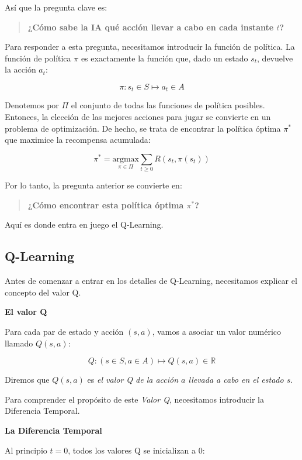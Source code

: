 \documentclass[]{book}
\begin{document}
Así que la pregunta clave es:

\begin{quote}
\textbf{¿Cómo sabe la IA qué acción llevar a cabo en cada instante \(t\)?}
\end{quote}

Para responder a esta pregunta, necesitamos introducir la función de política. La función de política \(\pi\) es exactamente la función que, dado un estado \(s_t\), devuelve la acción \(a_t\):

\[\pi: s_t \in S \mapsto a_t \in A\]

Denotemos por \(\Pi\) el conjunto de todas las funciones de política posibles. Entonces, la elección de las mejores acciones para jugar se convierte en un problema de optimización. De hecho, se trata de encontrar la política óptima \(\pi^*\) que maximice la recompensa acumulada:

\[\pi^* = \underset{\pi \in \Pi}{\textrm{argmax}} \sum_{t \ge 0} R(s_t,\pi(s_t))\]

Por lo tanto, la pregunta anterior se convierte en:

\begin{quote}
\textbf{¿Cómo encontrar esta política óptima \(\pi^*\)?}
\end{quote}

Aquí es donde entra en juego el Q-Learning.

\hypertarget{q-learning}{%
\subsection{Q-Learning}\label{q-learning}}

Antes de comenzar a entrar en los detalles de Q-Learning, necesitamos explicar el concepto del valor Q.

\textbf{El valor Q}

Para cada par de estado y acción \((s, a)\), vamos a asociar un valor numérico llamado \(Q (s, a)\):

\[Q: (s \in S, a \in A) \mapsto Q(s,a) \in \mathbb{R}\]

Diremos que \(Q (s, a)\) es \emph{el valor Q de la acción \(a\) llevada a cabo en el estado \(s\)}.

Para comprender el propósito de este \emph{Valor Q}, necesitamos introducir la Diferencia Temporal.

\textbf{La Diferencia Temporal}

Al principio \(t = 0\), todos los valores Q se inicializan a 0:
\end{document}
